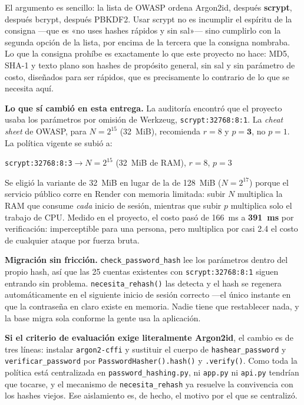 \documentclass[11pt,letterpaper]{article}
\begin{document}
El argumento es sencillo: la lista de OWASP ordena Argon2id, después
\textbf{scrypt}, después bcrypt, después PBKDF2. Usar scrypt no es incumplir
el espíritu de la consigna —que es «no uses hashes rápidos y sin sal»— sino
cumplirlo con la segunda opción de la lista, por encima de la tercera que la
consigna nombraba. Lo que la consigna prohíbe es exactamente lo que este
proyecto no hace: MD5, SHA-1 y texto plano son hashes de propósito general,
sin sal y sin parámetro de costo, diseñados para ser rápidos, que es
precisamente lo contrario de lo que se necesita aquí.

\begin{bien}
\textbf{Lo que sí cambió en esta entrega.} La auditoría encontró que el
proyecto usaba los parámetros por omisión de Werkzeug,
\texttt{scrypt:32768:8:1}. La \emph{cheat sheet} de OWASP, para
$N = 2^{15}$ (32~MiB), recomienda $r = 8$ y $p = \mathbf{3}$, no $p = 1$. La
política vigente se subió a:

\begin{center}
\texttt{scrypt:32768:8:3}\quad$\rightarrow$\quad $N = 2^{15}$ (32~MiB de RAM),
$r = 8$, $p = 3$
\end{center}

Se eligió la variante de 32~MiB en lugar de la de 128~MiB ($N = 2^{17}$)
porque el servicio público corre en Render con memoria limitada: subir $N$
multiplica la RAM que consume \emph{cada} inicio de sesión, mientras que subir
$p$ multiplica solo el trabajo de CPU. Medido en el proyecto, el costo pasó de
166~ms a \textbf{391~ms} por verificación: imperceptible para una persona,
pero multiplica por casi 2.4 el costo de cualquier ataque por fuerza bruta.
\end{bien}

\begin{nota}
\textbf{Migración sin fricción.} \texttt{check\_password\_hash} lee los
parámetros dentro del propio hash, así que las 25 cuentas existentes con
\texttt{scrypt:32768:8:1} siguen entrando sin problema.
\texttt{necesita\_rehash()} las detecta y el hash se regenera automáticamente
en el siguiente inicio de sesión correcto —el único instante en que la
contraseña en claro existe en memoria. Nadie tiene que restablecer nada, y la
base migra sola conforme la gente usa la aplicación.

\textbf{Si el criterio de evaluación exige literalmente Argon2id}, el cambio
es de tres líneas: instalar \texttt{argon2-cffi} y sustituir el cuerpo de
\texttt{hashear\_password} y \texttt{verificar\_password} por
\texttt{PasswordHasher().hash()} y \texttt{.verify()}. Como toda la política
está centralizada en \texttt{password\_hashing.py}, ni \texttt{app.py} ni
\texttt{api.py} tendrían que tocarse, y el mecanismo de \texttt{necesita\_rehash}
ya resuelve la convivencia con los hashes viejos. Ese aislamiento es, de hecho,
el motivo por el que se centralizó.
\end{nota}
\end{document}
